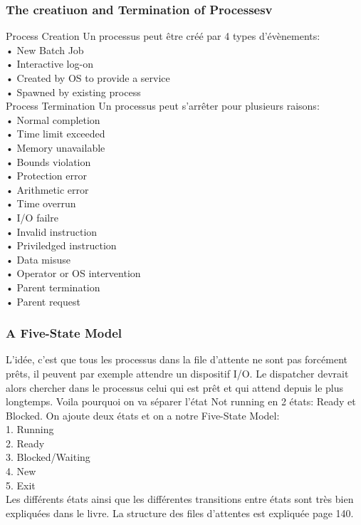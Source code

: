 \subsubsection{The creatiuon and Termination of Processesv}
Process Creation
Un processus peut être créé par 4 types d'évènements: \\
• New Batch Job \\
• Interactive log-on \\
• Created by OS to provide a service \\
• Spawned by existing process \\
Process Termination
Un processus peut s'arrêter pour plusieurs raisons:  \\
• Normal completion \\
• Time limit exceeded \\
• Memory unavailable \\
• Bounds violation \\
• Protection error \\
• Arithmetic error \\
• Time overrun \\
• I/O failre \\
• Invalid instruction \\
• Priviledged instruction \\
• Data misuse \\
• Operator or OS intervention  \\
• Parent termination \\
• Parent request \\
\subsubsection{A Five-State Model}
L'idée, c'est que tous les processus dans la file d'attente ne sont pas forcément prêts, il peuvent par exemple attendre un dispositif I/O.
Le dispatcher devrait alors chercher dans le processus celui qui est prêt et qui attend depuis le plus longtemps.
Voila pourquoi on va séparer l'état Not running en 2 états: Ready et Blocked.
On ajoute deux états et on a notre Five-State Model: \\
1. Running \\
2. Ready \\
3. Blocked/Waiting  \\
4. New \\
5. Exit \\
Les différents états ainsi que les différentes transitions entre états sont très bien expliquées dans le livre.
La structure des files d'attentes est expliquée page 140.
